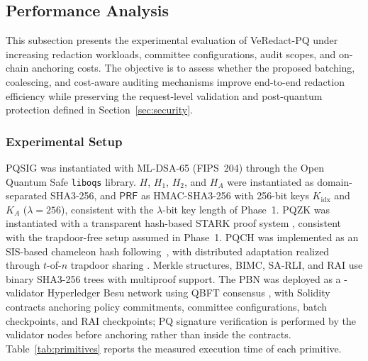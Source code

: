     \subsection{Performance Analysis}
    \label{subsec:performance-analysis}

    This subsection presents the experimental evaluation of VeRedact-PQ
    under increasing redaction workloads, committee configurations, audit
    scopes, and on-chain anchoring costs. The objective is to assess whether
    the proposed batching, coalescing, and cost-aware auditing mechanisms
    improve end-to-end redaction efficiency while preserving the
    request-level validation and post-quantum protection defined in
    Section~\ref{sec:security}.

    \subsubsection{Experimental Setup}


    PQSIG was instantiated with ML-DSA-65 (FIPS~204) through the Open Quantum
    Safe \texttt{liboqs} library. $H$, $H_1$, $H_2$, and $H_A$ were
    instantiated as domain-separated SHA3-256, and $\mathsf{PRF}$ as
    HMAC-SHA3-256 with 256-bit keys $K_{\mathrm{idx}}$
    and $K_A$ { ($\lambda=256$)}, consistent with the {$\lambda$}-bit key length of Phase~1. PQZK was instantiated with a transparent hash-based
    STARK proof system , consistent with the
    trapdoor-free setup assumed in Phase~1. PQCH was implemented as an
    SIS-based chameleon hash following~\cite{ref10,ref17}, with distributed
    adaptation realized through $t$-of-$n$ trapdoor sharing
    . Merkle structures, BIMC, SA-RLI,
    and RAI use binary SHA3-256 trees with multiproof support. The PBN was
    deployed as a -validator Hyperledger Besu network using
    QBFT consensus , with Solidity contracts anchoring policy commitments,
    committee configurations, batch checkpoints, and RAI checkpoints; PQ
    signature verification is performed by the validator nodes before
    anchoring rather than inside the contracts. Table~\ref{tab:primitives}
    reports the measured execution time of each primitive.

